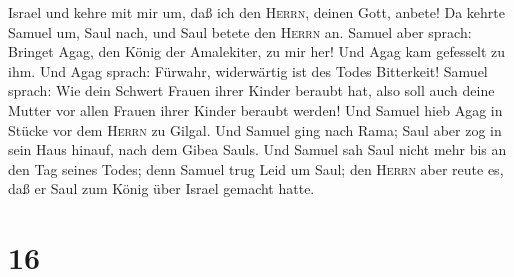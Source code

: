 Israel und kehre mit mir um, daß ich den \textsc{Herrn}, deinen Gott,
anbete!  Da kehrte Samuel um, Saul nach, und Saul betete
den \textsc{Herrn} an.  Samuel aber sprach: Bringet Agag,
den König der Amalekiter, zu mir her! Und Agag kam gefesselt zu ihm. Und
Agag sprach: Fürwahr, widerwärtig ist des Todes Bitterkeit!
 Samuel sprach: Wie dein Schwert Frauen ihrer Kinder
beraubt hat, also soll auch deine Mutter vor allen Frauen ihrer Kinder
beraubt werden! Und Samuel hieb Agag in Stücke vor dem \textsc{Herrn} zu
Gilgal.  Und Samuel ging nach Rama; Saul aber zog in sein
Haus hinauf, nach dem Gibea Sauls.  Und Samuel sah Saul
nicht mehr bis an den Tag seines Todes; denn Samuel trug Leid um Saul;
den \textsc{Herrn} aber reute es, daß er Saul zum König über Israel
gemacht hatte.

\hypertarget{section-15}{%
\section{16}\label{section-15}}

